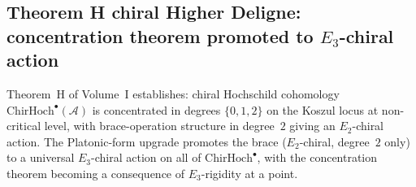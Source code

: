 \documentclass[11pt]{article}
\begin{document}
\subsection{Theorem H chiral Higher Deligne: concentration theorem promoted to $E_3$-chiral action}
\label{subsec:theoremH-chiral-higher-deligne}

Theorem~H of Volume~I establishes: chiral Hochschild cohomology
$\mathrm{ChirHoch}^\bullet(\mathcal{A})$ is concentrated in degrees
$\{0, 1, 2\}$ on the Koszul locus at non-critical level, with
brace-operation structure in degree~$2$ giving an $E_2$-chiral
action. The Platonic-form upgrade promotes the brace
($E_2$-chiral, degree~$2$ only) to a universal $E_3$-chiral action
on all of $\mathrm{ChirHoch}^\bullet$, with the concentration
theorem becoming a consequence of $E_3$-rigidity at a point.
\end{document}
